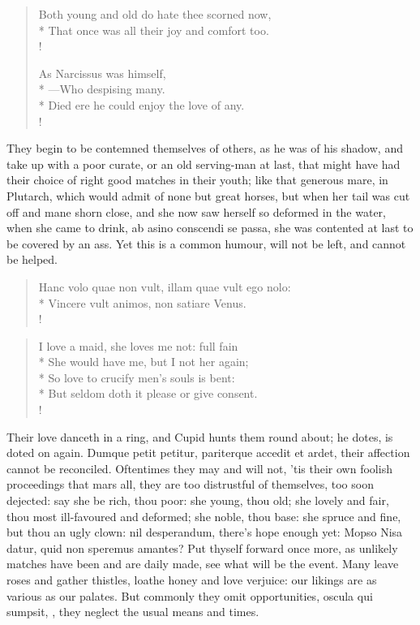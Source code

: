 \begin{verse}%
Both young and old do hate thee scorned now,\\*
That once was all their joy and comfort too.\\!

As Narcissus was himself,\\*
---Who despising many.\\*
Died ere he could enjoy the love of any.\\!
\end{verse}%

They begin to be contemned themselves of others, as he was of his
shadow, and take up with a poor curate, or an old serving-man at last,
that might have had their choice of right good matches in their youth;
like that generous mare, in Plutarch, which would admit of none
but great horses, but when her tail was cut off and mane shorn close,
and she now saw herself so deformed in the water, when she came to
drink, ab asino conscendi se passa, she was contented at last to be
covered by an ass. Yet this is a common humour, will not be left, and
cannot be helped.
%
\begin{latin}%
\begin{verse}%
Hanc volo quae non vult, illam quae vult ego nolo:\\*
Vincere vult animos, non satiare Venus.\\!
\end{verse}%
\end{latin}%
\translationrule%
\begin{verse}%
I love a maid, she loves me not: full fain\\*
She would have me, but I not her again;\\*
So love to crucify men's souls is bent:\\*
But seldom doth it please or give consent.\\!
\end{verse}%
%

Their love danceth in a ring, and Cupid hunts them round about; he
dotes, is doted on again. Dumque petit petitur, pariterque accedit et
ardet, their affection cannot be reconciled. Oftentimes they may and
will not, 'tis their own foolish proceedings that mars all, they are
too distrustful of themselves, too soon dejected: say she be rich, thou
poor: she young, thou old; she lovely and fair, thou most ill-favoured
and deformed; she noble, thou base: she spruce and fine, but thou an
ugly clown: nil desperandum, there's hope enough yet: Mopso Nisa datur,
quid non speremus amantes? Put thyself forward once more, as unlikely
matches have been and are daily made, see what will be the event. Many
leave roses and gather thistles, loathe honey and love verjuice: our
likings are as various as our palates. But commonly they omit
opportunities, oscula qui sumpsit, \etc{}, they neglect the usual means
and times.

